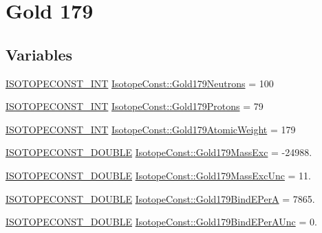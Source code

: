 \hypertarget{group___isotope_const-_gold-_au179}{}\section{Gold 179}
\label{group___isotope_const-_gold-_au179}
\subsection*{Variables}
\begin{DoxyCompactItemize}
\item 
\mbox{\hyperlink{group___isotope_const-_macros_ga5f18360b3e99483a35c32d789e62621c}{I\+S\+O\+T\+O\+P\+E\+C\+O\+N\+S\+T\+\_\+\+I\+NT}} \mbox{\hyperlink{group___isotope_const-_gold-_au179_ga56ef2d4d51bfe81285464b4bb1ebaec4}{Isotope\+Const\+::\+Gold179\+Neutrons}} = 100
\item 
\mbox{\hyperlink{group___isotope_const-_macros_ga5f18360b3e99483a35c32d789e62621c}{I\+S\+O\+T\+O\+P\+E\+C\+O\+N\+S\+T\+\_\+\+I\+NT}} \mbox{\hyperlink{group___isotope_const-_gold-_au179_ga7dcda9563f20b4f582ef379cdea0fa9c}{Isotope\+Const\+::\+Gold179\+Protons}} = 79
\item 
\mbox{\hyperlink{group___isotope_const-_macros_ga5f18360b3e99483a35c32d789e62621c}{I\+S\+O\+T\+O\+P\+E\+C\+O\+N\+S\+T\+\_\+\+I\+NT}} \mbox{\hyperlink{group___isotope_const-_gold-_au179_ga4b1fe906bda198bff54e3314f392994a}{Isotope\+Const\+::\+Gold179\+Atomic\+Weight}} = 179
\item 
\mbox{\hyperlink{group___isotope_const-_macros_ga8f45a7272ce02c0b4c65c44636ed719a}{I\+S\+O\+T\+O\+P\+E\+C\+O\+N\+S\+T\+\_\+\+D\+O\+U\+B\+LE}} \mbox{\hyperlink{group___isotope_const-_gold-_au179_gafb3329f900163d4ac890ec32ee9acad0}{Isotope\+Const\+::\+Gold179\+Mass\+Exc}} = -\/24988.
\item 
\mbox{\hyperlink{group___isotope_const-_macros_ga8f45a7272ce02c0b4c65c44636ed719a}{I\+S\+O\+T\+O\+P\+E\+C\+O\+N\+S\+T\+\_\+\+D\+O\+U\+B\+LE}} \mbox{\hyperlink{group___isotope_const-_gold-_au179_ga5ed0309e59f6d2b5bc7d51b85e12d5bf}{Isotope\+Const\+::\+Gold179\+Mass\+Exc\+Unc}} = 11.
\item 
\mbox{\hyperlink{group___isotope_const-_macros_ga8f45a7272ce02c0b4c65c44636ed719a}{I\+S\+O\+T\+O\+P\+E\+C\+O\+N\+S\+T\+\_\+\+D\+O\+U\+B\+LE}} \mbox{\hyperlink{group___isotope_const-_gold-_au179_ga7fde30b2e56ea64dbd38d60cf5011085}{Isotope\+Const\+::\+Gold179\+Bind\+E\+PerA}} = 7865.
\item 
\mbox{\hyperlink{group___isotope_const-_macros_ga8f45a7272ce02c0b4c65c44636ed719a}{I\+S\+O\+T\+O\+P\+E\+C\+O\+N\+S\+T\+\_\+\+D\+O\+U\+B\+LE}} \mbox{\hyperlink{group___isotope_const-_gold-_au179_ga0f81d105bf7ffb0758c4cee54225ed92}{Isotope\+Const\+::\+Gold179\+Bind\+E\+Per\+A\+Unc}} = 0.

\end{DoxyCompactItemize}
